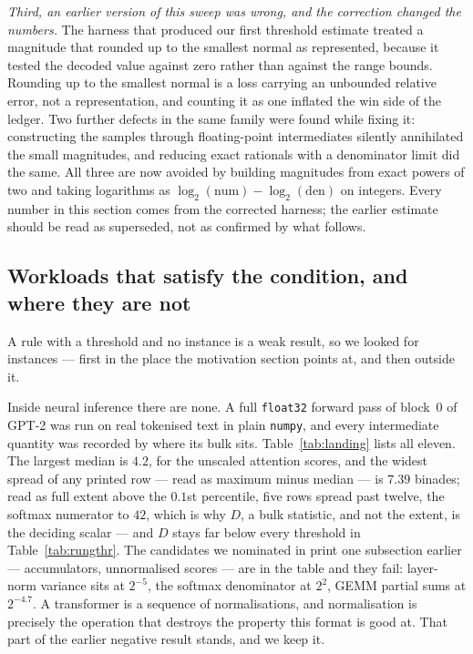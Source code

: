 \emph{Third, an earlier version of this sweep was wrong, and the correction
changed the numbers.} The harness that produced our first threshold estimate
treated a magnitude that rounded up to the smallest normal as represented, because
it tested the decoded value against zero rather than against the range bounds.
Rounding up to the smallest normal is a loss carrying an unbounded relative error,
not a representation, and counting it as one inflated the win side of the ledger.
Two further defects in the same family were found while fixing it: constructing
the samples through floating-point intermediates silently annihilated the small
magnitudes, and reducing exact rationals with a denominator limit did the same. All
three are now avoided by building magnitudes from exact powers of two and taking
logarithms as $\log_2(\text{num}) - \log_2(\text{den})$ on integers. Every number
in this section comes from the corrected harness; the earlier estimate should be
read as superseded, not as confirmed by what follows.

\subsection{Workloads that satisfy the condition, and where they are not}
\label{sec:nolanding}

A rule with a threshold and no instance is a weak result, so we looked for
instances --- first in the place the motivation section points at, and then
outside it.

Inside neural inference there are none. A full \texttt{float32} forward pass of
block~$0$ of GPT-2 was run on real tokenised text in plain \texttt{numpy}, and
every intermediate quantity was recorded by where its bulk sits.
Table~\ref{tab:landing} lists all eleven. The largest median is $4.2$, for the
unscaled attention scores, and the widest spread of any printed row --- read
as maximum minus median --- is $7.39$ binades; read as full extent above the
$0.1$st percentile, five rows spread past twelve, the softmax numerator to
$42$, which is why $D$, a bulk statistic, and not the extent, is the deciding
scalar --- and $D$ stays far below every threshold in Table~\ref{tab:rungthr}. The
candidates we nominated in print one subsection earlier --- accumulators,
unnormalised scores --- are in the table and they fail: layer-norm variance sits
at $2^{-5}$, the softmax denominator at $2^{2}$, GEMM partial sums at
$2^{-4.7}$. A transformer is a sequence of normalisations, and normalisation is
precisely the operation that destroys the property this format is good at. That
part of the earlier negative result stands, and we keep it.

